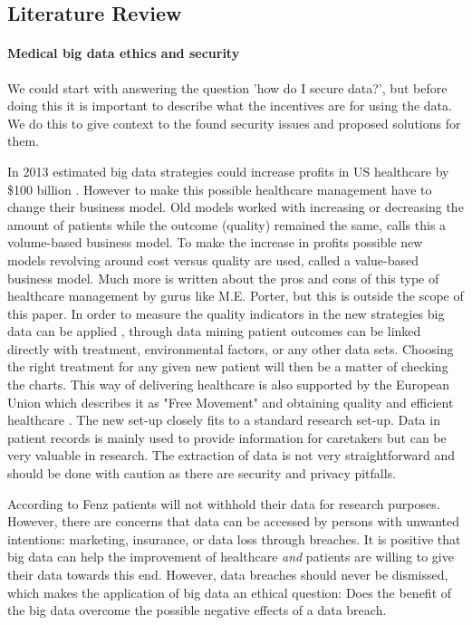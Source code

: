 \subsection{Literature Review}
\label{security-literature}

\paragraph{Medical big data ethics and security}
\label{security-ethics}

We could start with answering the question 'how do I secure data?', but before doing this it is important to describe what the incentives are for using the data.
We do this to give context to the found security issues and proposed solutions for them.

In 2013 \cite{s20Groves2013} estimated big data strategies could increase profits in US healthcare by \$100 billion \cite{s13Patil2014}.
However to make this possible healthcare management have to change their business model.
Old models worked with increasing or decreasing the amount of patients while the outcome (quality) remained the same, \cite{s13Patil2014} calls this a volume-based business model.
To make the increase in profits possible new models revolving around cost versus quality are used, called a value-based business model.
Much more is written about the pros and cons of this type of healthcare management by gurus like M.E. Porter, but this is outside the scope of this paper.
In order to measure the quality indicators in the new strategies big data can be applied \cite{s6West2009}, through data mining patient outcomes can be linked directly with treatment, environmental factors, or any other data sets.
Choosing the right treatment for any given new patient will then be a matter of checking the charts.
This way of delivering healthcare is also supported by the European Union which describes it as "Free Movement" and obtaining quality and efficient healthcare \cite{s8FernandezAleman2013}.
The new set-up closely fits to a standard research set-up.
Data in patient records is mainly used to provide information for caretakers but can be very valuable in research\cite{s15Fenz2014}.
The extraction of data is not very straightforward and should be done with caution as there are security and privacy pitfalls.

According to Fenz \cite{s15Fenz2014} patients will not withhold their data for research purposes.
However, there are concerns that data can be accessed by persons with unwanted intentions: marketing, insurance, or data loss through breaches.
It is positive that big data can help the improvement of healthcare \emph{and} patients are willing to give their data towards this end.
However, data breaches should never be dismissed, which makes the application of big data an ethical question: Does the benefit of the big data overcome the possible negative effects of a data breach.

